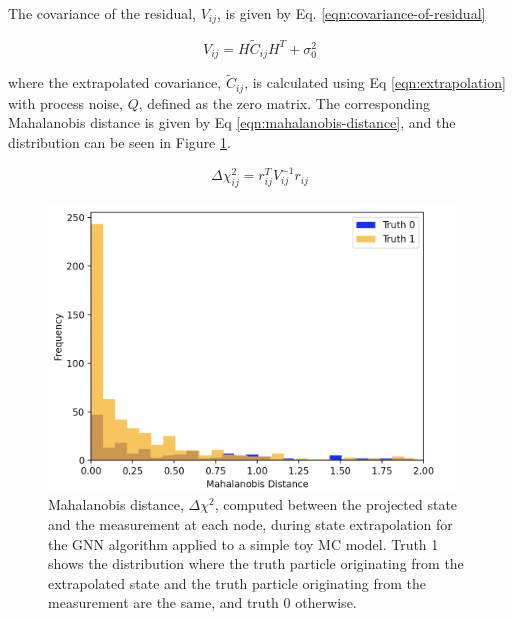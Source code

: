The covariance of the residual, $V_{ij}$, is given by Eq. \eqref{eqn:covariance-of-residual}

\begin{equation}
{V}_{ij} = H \widetilde{C}_{ij} H^{T} + \sigma_{0}^{2}
\label{eqn:covariance-of-residual}
\end{equation}

where the extrapolated covariance, $\widetilde{C}_{ij}$, is calculated using Eq \eqref{eqn:extrapolation} with process noise, $Q$, defined as the zero matrix. The corresponding Mahalanobis distance is given by Eq \eqref{eqn:mahalanobis-distance}, and the distribution can be seen in Figure \ref{fig:mahalanobis-threshold-toy-model}.

\begin{equation}
\Delta \chi_{ij}^{2} = r_{ij}^{T} {V}_{ij}^{-1} r_{ij}
\label{eqn:mahalanobis-distance}
\end{equation}


\begin{figure}[H]
    \centering
    \includegraphics[width=0.96\textwidth]{images/5-gnn-algorithm/mahalanobis-threshold-toy-model-2.png}
    \caption{Mahalanobis distance, $\Delta \chi^{2}$, computed between the projected state and the measurement at each node, during state extrapolation for the GNN algorithm applied to a simple toy MC model. Truth 1 shows the distribution where the truth particle originating from the extrapolated state and the truth particle originating from the measurement are the same, and truth 0 otherwise.}
    \label{fig:mahalanobis-threshold-toy-model}%
\end{figure}




